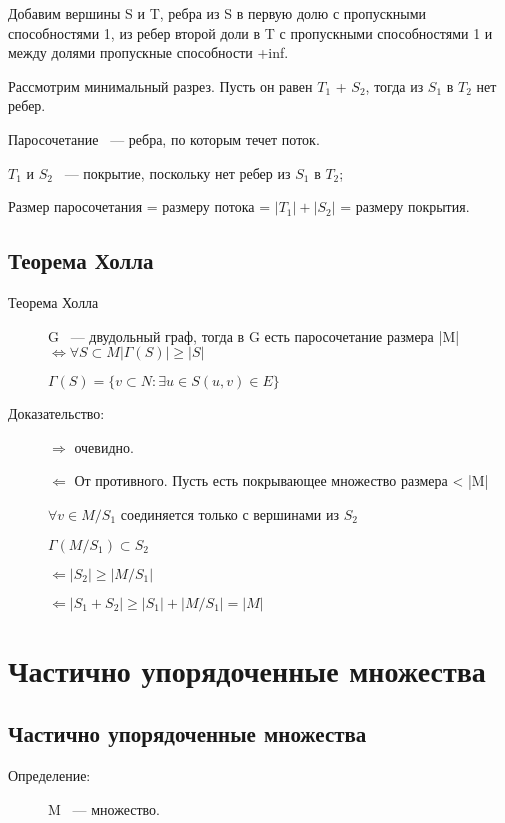 \documentclass[12pt]{article}
\begin{document}
\begin{description}
\begin{description}
Добавим вершины S и T, ребра из S в первую долю с пропускными способностями 1, из ребер второй доли в T с пропускными способностями 1 и между долями пропускные способности +inf.

Рассмотрим минимальный разрез. Пусть он равен $T_1$ + $S_2$, тогда из $S_1$ в $T_2$ нет ребер. 

Паросочетание ~--- ребра, по которым течет поток. 

 $T_1$ и $S_2$ ~--- покрытие, поскольку нет ребер из $S_1$ в $T_2$;


Размер паросочетания = размеру потока = $|T_1|+| S_2|$ = размеру покрытия.

\end{description}

\subsection{Теорема Холла}

\begin{description}
\item [Теорема Холла] G ~--- двудольный граф, тогда в G есть паросочетание размера |M| $\Leftrightarrow \forall S \subset M |\Gamma (S)| \ge |S|$

$\Gamma(S) = \{v \subset N: \exists u \in S (u, v) \in E\}$

\item[Доказательство:] 

$\Rightarrow$ очевидно.

$\Leftarrow$ От противного. Пусть есть покрывающее множество размера < |M|

$\forall v \in M/S_1$ соединяется только с вершинами из $S_2$ 

$\Gamma (M/S_1) \subset S_2$

$\Leftarrow |S_2| \ge |M/S_1|$

$\Leftarrow |S_1 + S_2| \ge |S_1| + |M/S_1| = |M|$


\end{description}


\section{Частично упорядоченные множества}

\subsection{Частично упорядоченные множества}
\begin{description}
\item[Определение:]  M ~--- множество. 


\end{description}
\end{description}
\end{document}
